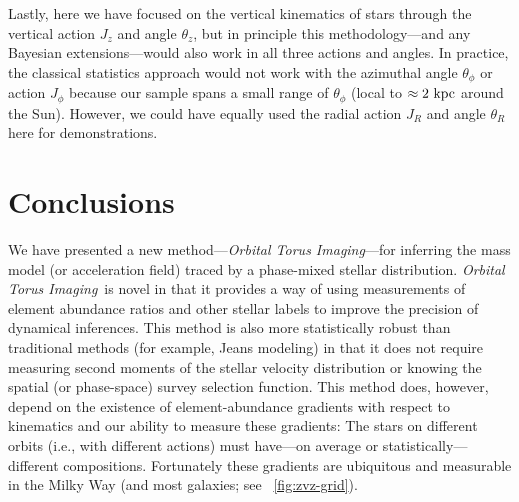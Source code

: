 \documentclass[modern]{aastex63}
\newcommand{\methodname}{\textsl{Orbital Torus Imaging}}
\begin{document}
Lastly, here we have focused on the vertical kinematics of stars through the
vertical action $J_z$ and angle $\theta_z$, but in principle this
methodology---and any Bayesian extensions---would also work in all three actions
and angles.
In practice, the classical statistics approach would not work with the azimuthal
angle $\theta_\phi$ or action $J_\phi$ because our sample spans a small range of
$\theta_\phi$ (local to $\approx 2~\mathrm{kpc}$ around the Sun).
However, we could have equally used the radial action $J_R$ and angle $\theta_R$
here for demonstrations.




\section{Conclusions}
\label{sec:conclusions}

We have presented a new method---\methodname---for inferring the mass model (or
acceleration field) traced by a phase-mixed stellar distribution.
\methodname\ is novel in that it provides a way of using measurements of element
abundance ratios and other stellar labels to improve the precision of dynamical
inferences.
This method is also more statistically robust than traditional methods (for
example, Jeans modeling) in that it does not require measuring second moments of
the stellar velocity distribution or knowing the spatial (or phase-space) survey
selection function.
This method does, however, depend on the existence of element-abundance
gradients with respect to kinematics and our ability to measure these gradients:
The stars on different orbits (i.e., with different actions) must have---on
average or statistically---different compositions.
Fortunately these gradients are ubiquitous and measurable in the Milky Way (and
most galaxies; see \figurename~\ref{fig:zvz-grid}).
\end{document}
